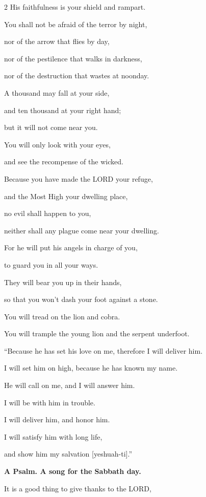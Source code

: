 \begin{multicols}{2}
	His faithfulness is your shield and rampart.
	
	
	\myverse{}You shall not be afraid of the terror by night,
	
	nor of the arrow that flies by day,
	
	
	\myverse{}nor of the pestilence that walks in darkness,
	
	nor of the destruction that wastes at noonday.
	
	
	\myverse{}A thousand may fall at your side,
	
	and ten thousand at your right hand;
	
	but it will not come near you.
	
	
	\myverse{}You will only look with your eyes,
	
	and see the recompense of the wicked.
	
	
	\myverse{}Because you have made the LORD your refuge,
	
	and the Most High your dwelling place,
	
	
	\myverse{}no evil shall happen to you,
	
	neither shall any plague come near your dwelling.
	
	
	\myverse{}For he will put his angels in charge of you,
	
	to guard you in all your ways.
	
	
	\myverse{}They will bear you up in their hands,
	
	so that you won’t dash your foot against a stone.
	
	
	\myverse{}You will tread on the lion and cobra.
	
	You will trample the young lion and the serpent underfoot.
	
	
	\myverse{}“Because he has set his love on me, therefore I will deliver
	him.
	
	I will set him on high, because he has known my name.
	
	
	\myverse{}He will call on me, and I will answer him.
	
	I will be with him in trouble.
	
	I will deliver him, and honor him.
	
	
	\myverse{}I will satisfy him with long life,
	
	and show him my salvation [yeshuah-ti].”
	
	
	\mychapter{}\textbf{A Psalm. A song for the Sabbath day.}
	
\quad \myverse*{}It is a good thing to give thanks to the LORD,
	

\end{multicols}

